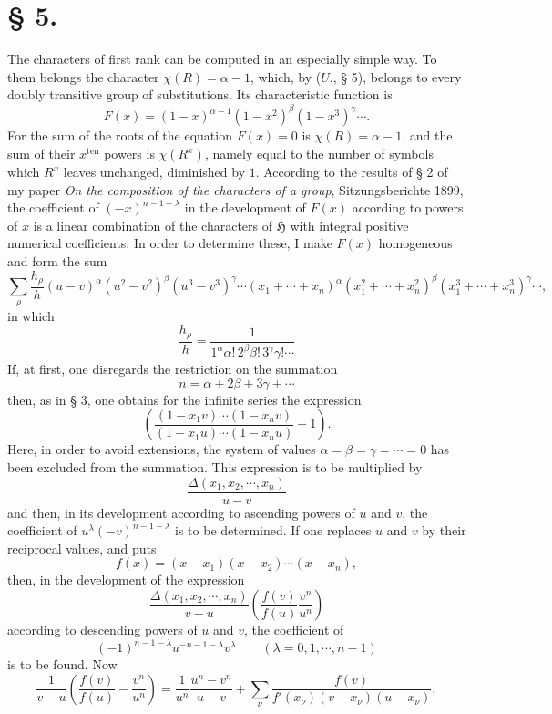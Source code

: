 \documentclass[11pt]{article}
\newcommand{\Hgr}{\mathfrak{H}}
\newcommand{\ten}{\mathrm{ten}}
\begin{document}
\section*{§ 5.}

The characters of first rank can be computed in an especially simple way. To them belongs the character $\chi(R)=\alpha-1$, which, by ($U.$, § 5), belongs to every doubly transitive group of substitutions. Its characteristic function is
\begin{equation}\tag{1.}
 F(x)=(1-x)^{\alpha-1}(1-x^2)^\beta(1-x^3)^\gamma\cdots.
\end{equation}
For the sum of the roots of the equation $F(x)=0$ is $\chi(R)=\alpha-1$, and the sum of their $x^{\ten}$ powers is $\chi(R^x)$, namely equal to the number of symbols which $R^x$ leaves unchanged, diminished by $1$. According to the results of § 2 of my paper \emph{On the composition of the characters of a group}, Sitzungsberichte 1899, the coefficient of $(-x)^{n-1-
\lambda}$ in the development of $F(x)$ according to powers of $x$ is a linear combination of the characters of $\Hgr$ with integral positive numerical coefficients. In order to determine these, I make $F(x)$ homogeneous and form the sum
\[
 \sum_\rho\frac{h_\rho}{h}(u-v)^\alpha(u^2-v^2)^\beta(u^3-v^3)^\gamma\cdots
 (x_1+
\cdots+x_n)^\alpha(x_1^2+
\cdots+x_n^2)^\beta(x_1^3+
\cdots+x_n^3)^\gamma\cdots,
\]
in which
\[
 \frac{h_\rho}{h}=\frac{1}{1^\alpha\alpha!\,2^\beta\beta!\,3^\gamma\gamma!\cdots}
\]
If, at first, one disregards the restriction on the summation
\[
 n=\alpha+2\beta+3\gamma+
\cdots
\]
then, as in § 3, one obtains for the infinite series the expression
\[
 \left(\frac{(1-x_1v)\cdots(1-x_nv)}{(1-x_1u)\cdots(1-x_nu)}-1\right).
\]
Here, in order to avoid extensions, the system of values $\alpha=\beta=\gamma=\cdots=0$ has been excluded from the summation. This expression is to be multiplied by
\[
 \frac{\Delta(x_1,x_2,
\cdots,x_n)}{u-v}
\]
and then, in its development according to ascending powers of $u$ and $v$, the coefficient of $u^\lambda(-v)^{n-1-
\lambda}$ is to be determined. If one replaces $u$ and $v$ by their reciprocal values, and puts
\[
 f(x)=(x-x_1)(x-x_2)\cdots(x-x_n),
\]
then, in the development of the expression
\[
 \frac{\Delta(x_1,x_2,
\cdots,x_n)}{v-u}\left(\frac{f(v)}{f(u)}\frac{v^n}{u^n}\right)
\]
according to descending powers of $u$ and $v$, the coefficient of
\[
 (-1)^{n-1-
\lambda}u^{-n-1-
\lambda}v^\lambda\qquad(\lambda=0,1,
\cdots,n-1)
\]
is to be found. Now
\[
 \frac1{v-u}\left(\frac{f(v)}{f(u)}-\frac{v^n}{u^n}\right)=\frac1{u^n}\frac{u^n-v^n}{u-v}+
 \sum_\nu\frac{f(v)}{f'(x_\nu)(v-x_\nu)(u-x_\nu)},
\]
\end{document}
